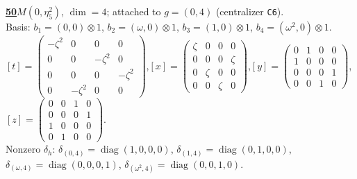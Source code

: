 \begin{samepage}\noindent\textbf{\underline{50}}\quad $M(0,\eta^{2}_{5})$, $\dim=4$; attached to $g=(0,4)$ (centralizer \texttt{C6}).\\
Basis: $b_{1}=(0,0)\otimes 1$, $b_{2}=(\omega,0)\otimes 1$, $b_{3}=(1,0)\otimes 1$, $b_{4}=(\omega^2,0)\otimes 1$.\\
$[t]=\left(\begin{smallmatrix} -\zeta^2 & 0 & 0 & 0 \\ 0 & 0 & -\zeta^2 & 0 \\ 0 & 0 & 0 & -\zeta^2 \\ 0 & -\zeta^2 & 0 & 0 \end{smallmatrix}\right)$,\quad $[x]=\left(\begin{smallmatrix} \zeta & 0 & 0 & 0 \\ 0 & 0 & 0 & \zeta \\ 0 & \zeta & 0 & 0 \\ 0 & 0 & \zeta & 0 \end{smallmatrix}\right)$,\quad $[y]=\left(\begin{smallmatrix} 0 & 1 & 0 & 0 \\ 1 & 0 & 0 & 0 \\ 0 & 0 & 0 & 1 \\ 0 & 0 & 1 & 0 \end{smallmatrix}\right)$,\quad $[z]=\left(\begin{smallmatrix} 0 & 0 & 1 & 0 \\ 0 & 0 & 0 & 1 \\ 1 & 0 & 0 & 0 \\ 0 & 1 & 0 & 0 \end{smallmatrix}\right)$.\\
Nonzero $\delta_h$: $\delta_{(0,4)}=\operatorname{diag}(1,0,0,0)$, $\delta_{(1,4)}=\operatorname{diag}(0,1,0,0)$, $\delta_{(\omega,4)}=\operatorname{diag}(0,0,0,1)$, $\delta_{(\omega^2,4)}=\operatorname{diag}(0,0,1,0)$.\end{samepage}
\medskip

